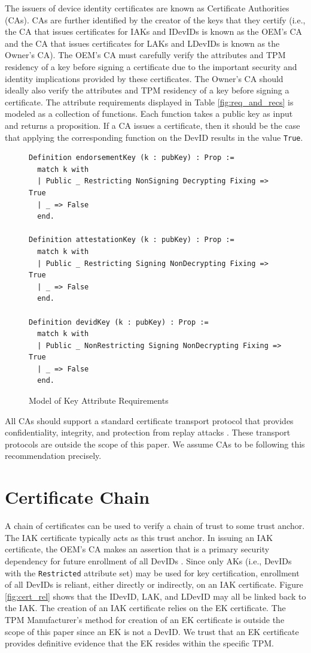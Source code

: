 The issuers of device identity certificates are known as Certificate Authorities (CAs). CAs are further identified by the creator of the keys that they certify (i.e., the CA that issues certificates for IAKs and IDevIDs is known as the OEM's CA and the CA that issues certificates for LAKs and LDevIDs is known as the Owner's CA). The OEM's CA must carefully verify the attributes and TPM residency of a key before signing a certificate due to the important security and identity implications provided by these certificates. The Owner's CA should ideally also verify the attributes and TPM residency of a key before signing a certificate. The attribute requirements displayed in Table \ref{fig:req_and_recs} is modeled as a collection of functions. Each function takes a public key as input and returns a proposition. If a CA issues a certificate, then it should be the case that applying the corresponding function on the DevID results in the value \verb|True|.
\begin{figure}[h]
\begin{lstlisting}[language=Coq]
Definition endorsementKey (k : pubKey) : Prop :=
  match k with
  | Public _ Restricting NonSigning Decrypting Fixing => True
  | _ => False
  end.

Definition attestationKey (k : pubKey) : Prop :=
  match k with
  | Public _ Restricting Signing NonDecrypting Fixing => True
  | _ => False
  end.

Definition devidKey (k : pubKey) : Prop :=
  match k with
  | Public _ NonRestricting Signing NonDecrypting Fixing => True
  | _ => False
  end.
\end{lstlisting}
\caption{Model of Key Attribute Requirements}
\end{figure}
All CAs should support a standard certificate transport protocol that provides confidentiality, integrity, and protection from replay attacks \cite{DevIDSpec-TCG}. These transport protocols are outside the scope of this paper. We assume CAs to be following this recommendation precisely. 




\section{Certificate Chain}

A chain of certificates can be used to verify a chain of trust to some trust anchor. The IAK certificate typically acts as this trust anchor. In issuing an IAK certificate, the OEM's CA makes an assertion that is a primary security dependency for future enrollment of all DevIDs \cite{DevIDSpec-TCG}. Since only AKs (i.e., DevIDs with the \verb|Restricted| attribute set) may be used for key certification, enrollment of all DevIDs is reliant, either directly or indirectly, on an IAK certificate. Figure \ref{fig:cert_rel} shows that the IDevID, LAK, and LDevID may all be linked back to the IAK. The creation of an IAK certificate relies on the EK certificate. The TPM Manufacturer's method for creation of an EK certificate is outside the scope of this paper since an EK is not a DevID. We trust that an EK certificate provides definitive evidence that the EK resides within the specific TPM.

